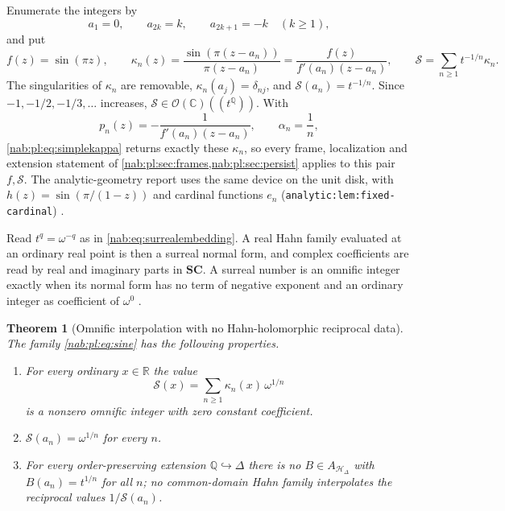 \documentclass[11pt,letterpaper]{article}
\newtheorem{theorem}{Theorem}[section]
\theoremstyle{definition}
\theoremstyle{remark}
\newcommand{\C}{\mathbb C}
\newcommand{\R}{\mathbb R}
\newcommand{\Q}{\mathbb Q}
\newcommand{\SC}{\mathbf{SC}}
\newcommand{\OO}{\mathcal O}
\newcommand{\HD}{\mathscr H_\Delta}
\numberwithin{equation}{section}
\begin{document}
Enumerate the integers by
\begin{equation}\label{nab:pl:eq:enumeration}
 a_1=0,\qquad a_{2k}=k,\qquad a_{2k+1}=-k\quad(k\geq1),
\end{equation}
and put
\begin{equation}\label{nab:pl:eq:sine}
 f(z)=\sin(\pi z),\qquad
 \kappa_n(z)=\frac{\sin(\pi(z-a_n))}{\pi(z-a_n)}=\frac{f(z)}{f'(a_n)(z-a_n)},\qquad
 \mathcal S=\sum_{n\geq1}t^{-1/n}\kappa_n .
\end{equation}
The singularities of $\kappa_n$ are removable, $\kappa_n(a_j)=\delta_{nj}$, and
$\mathcal S(a_n)=t^{-1/n}$. Since $-1,-1/2,-1/3,\ldots$ increases,
$\mathcal S\in\OO(\C)((t^\Q))$. With
\begin{equation}\label{nab:pl:eq:sinepole}
 p_n(z)=-\frac1{f'(a_n)(z-a_n)},\qquad \alpha_n=\frac1n,
\end{equation}
\eqref{nab:pl:eq:simplekappa} returns exactly these $\kappa_n$, so every frame,
localization and extension statement of
\cref{nab:pl:sec:frames,nab:pl:sec:persist} applies to this pair
$f,\mathcal S$. The analytic-geometry report uses the same device on the unit
disk, with $h(z)=\sin(\pi/(1-z))$ and cardinal functions $e_n$
(\nolinkurl{analytic:lem:fixed-cardinal}) \cite{RepoGeometry}.

Read $t^q=\omega^{-q}$ as in \eqref{nab:eq:surrealembedding}. A real Hahn
family evaluated at an ordinary real point is then a surreal normal form, and
complex coefficients are read by real and imaginary parts in $\SC$. A surreal
number is an omnific integer exactly when its normal form has no term of
negative exponent and an ordinary integer as coefficient of $\omega^0$
\cite{LM}.

\begin{theorem}[Omnific interpolation with no Hahn-holomorphic reciprocal
data]\label{nab:pl:thm:omnific}
The family \eqref{nab:pl:eq:sine} has the following properties.
\begin{enumerate}[label=\textup{(\roman*)}]
\item For every ordinary $x\in\R$ the value
\[
 \mathcal S(x)=\sum_{n\geq1}\kappa_n(x)\,\omega^{1/n}
\]
is a nonzero omnific integer with zero constant coefficient.
\item $\mathcal S(a_n)=\omega^{1/n}$ for every $n$.
\item For every order-preserving extension $\Q\hookrightarrow\Delta$ there is
no $B\in A_{\HD}$ with $B(a_n)=t^{1/n}$ for all $n$; no common-domain Hahn
family interpolates the reciprocal values $1/\mathcal S(a_n)$.
\end{enumerate}
\end{theorem}
\end{document}
